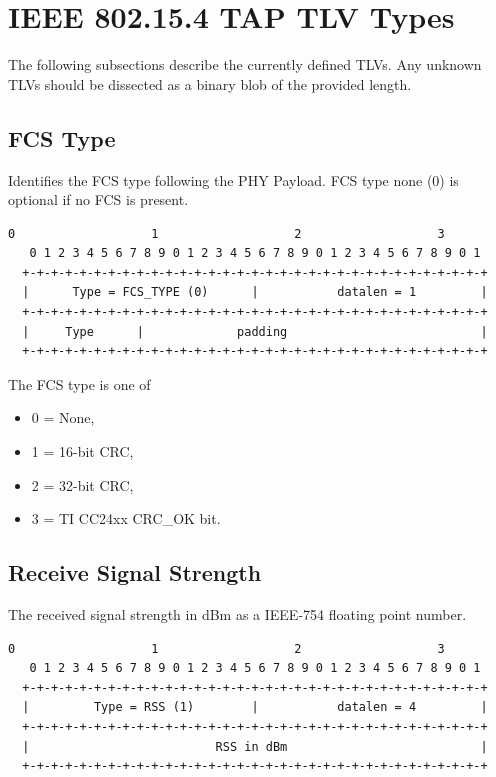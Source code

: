 \documentclass[12pt]{article}
\renewcommand\_{\textunderscore\allowbreak}
\begin{document}
\newpage
\section{IEEE 802.15.4 TAP TLV Types}

The following subsections describe the currently defined TLVs.  Any unknown
TLVs should be dissected as a binary blob of the provided length.

\subsection{FCS Type}

Identifies the FCS type following the PHY Payload.  FCS type none (0) is
optional if no FCS is present.

\begin{Verbatim}[samepage=true]
   0                   1                   2                   3
   0 1 2 3 4 5 6 7 8 9 0 1 2 3 4 5 6 7 8 9 0 1 2 3 4 5 6 7 8 9 0 1
  +-+-+-+-+-+-+-+-+-+-+-+-+-+-+-+-+-+-+-+-+-+-+-+-+-+-+-+-+-+-+-+-+
  |      Type = FCS_TYPE (0)      |           datalen = 1         |
  +-+-+-+-+-+-+-+-+-+-+-+-+-+-+-+-+-+-+-+-+-+-+-+-+-+-+-+-+-+-+-+-+
  |     Type      |             padding                           |
  +-+-+-+-+-+-+-+-+-+-+-+-+-+-+-+-+-+-+-+-+-+-+-+-+-+-+-+-+-+-+-+-+
\end{Verbatim}

The FCS type is one of
    \begin{itemize}
        \item 0 = None,
        \item 1 = 16-bit CRC,
        \item 2 = 32-bit CRC,
        \item 3 = TI CC24xx CRC_OK bit.
    \end{itemize}

\subsection{Receive Signal Strength}
The received signal strength in dBm as a IEEE-754 floating point number.

\begin{Verbatim}[samepage=true]
   0                   1                   2                   3
   0 1 2 3 4 5 6 7 8 9 0 1 2 3 4 5 6 7 8 9 0 1 2 3 4 5 6 7 8 9 0 1
  +-+-+-+-+-+-+-+-+-+-+-+-+-+-+-+-+-+-+-+-+-+-+-+-+-+-+-+-+-+-+-+-+
  |         Type = RSS (1)        |           datalen = 4         |
  +-+-+-+-+-+-+-+-+-+-+-+-+-+-+-+-+-+-+-+-+-+-+-+-+-+-+-+-+-+-+-+-+
  |                          RSS in dBm                           |
  +-+-+-+-+-+-+-+-+-+-+-+-+-+-+-+-+-+-+-+-+-+-+-+-+-+-+-+-+-+-+-+-+
\end{Verbatim}
\end{document}
